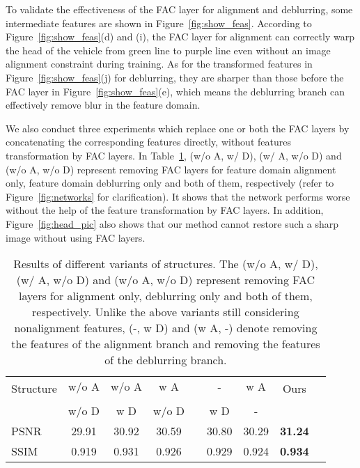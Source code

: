 \documentclass[10pt,twocolumn,letterpaper]{article}
\begin{document}
To validate the effectiveness of the FAC layer for alignment and deblurring, some intermediate features are shown in Figure~\ref{fig:show_feas}.
According to Figure~\ref{fig:show_feas}(d) and (i), the FAC layer for alignment can correctly warp the head of the vehicle from green line to purple line even without an image alignment constraint during training.
As for the transformed features in Figure~\ref{fig:show_feas}(j) for deblurring, they are sharper than those before the FAC layer in Figure~\ref{fig:show_feas}(e), which means the deblurring branch can effectively remove blur in the feature domain.


We also conduct three experiments which replace one or both the FAC layers by concatenating the corresponding features directly, without features transformation by FAC layers.
In Table~\ref{tab:structure}, (w/o A, w/ D), (w/ A, w/o D) and (w/o A, w/o D) represent removing FAC layers for feature domain alignment only, feature domain deblurring only and both of them, respectively (refer to Figure~\ref{fig:networks} for clarification).
It shows that the network performs worse without the help of the feature transformation by FAC layers.
In addition, Figure~\ref{fig:head_pic} also shows that our method cannot restore such a sharp image without using FAC layers.
\begin{table}[h]
	\centering
	\caption{Results of different variants of structures. 
The (w/o A, w/ D), (w/ A, w/o D) and (w/o A, w/o D) represent removing FAC layers for alignment only, deblurring only and both of them, respectively. 
Unlike the above variants still considering nonalignment features, (-, w D) and (w A, -) denote removing the features of the alignment branch and removing the features of the deblurring branch.}
	\vspace{-1mm}
	\resizebox{0.97\linewidth}{!} {
		\begin{tabular}{lcccccccc}
			\toprule
			\multirow{2}{*}{Structure} & w/o A & w/o A  & w A     && - & w A      &  \multirow{2}{*}{Ours} \\ \cline{2-4} \cline{6-7} \vspace{-3.5mm}\\
			& w/o D & w D     & w/o D  && w D    & -  &   \\
			\midrule
			PSNR          & 29.91       & 30.92       &  30.59      &&  30.80   & 30.29    & \bf{31.24}      \\
			SSIM           & 0.919       & 0.931       & 0.926       &&  0.929   & 0.924    & \bf{0.934}    \\
			\bottomrule
		\end{tabular}
	}
	\label{tab:structure}
	\vspace{-4mm}
\end{table}
\end{document}
